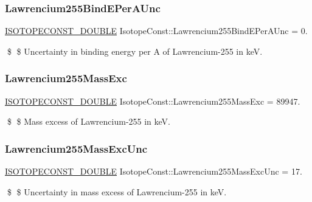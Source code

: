 \subsubsection{\texorpdfstring{Lawrencium255\+Bind\+E\+Per\+A\+Unc}{Lawrencium255BindEPerAUnc}}
{\footnotesize\ttfamily \mbox{\hyperlink{group___isotope_const-_macros_ga8f45a7272ce02c0b4c65c44636ed719a}{I\+S\+O\+T\+O\+P\+E\+C\+O\+N\+S\+T\+\_\+\+D\+O\+U\+B\+LE}} Isotope\+Const\+::\+Lawrencium255\+Bind\+E\+Per\+A\+Unc = 0.}

\$ \$ Uncertainty in binding energy per A of Lawrencium-\/255 in keV. \mbox{\label{group___isotope_const-_lawrencium-_lr255_ga5879f94861c51098d2dcc904a63f7c7a}} 
\subsubsection{\texorpdfstring{Lawrencium255\+Mass\+Exc}{Lawrencium255MassExc}}
{\footnotesize\ttfamily \mbox{\hyperlink{group___isotope_const-_macros_ga8f45a7272ce02c0b4c65c44636ed719a}{I\+S\+O\+T\+O\+P\+E\+C\+O\+N\+S\+T\+\_\+\+D\+O\+U\+B\+LE}} Isotope\+Const\+::\+Lawrencium255\+Mass\+Exc = 89947.}

\$ \$ Mass excess of Lawrencium-\/255 in keV. \mbox{\label{group___isotope_const-_lawrencium-_lr255_ga75e21e6a67820874ab056411ebce2f58}} 
\subsubsection{\texorpdfstring{Lawrencium255\+Mass\+Exc\+Unc}{Lawrencium255MassExcUnc}}
{\footnotesize\ttfamily \mbox{\hyperlink{group___isotope_const-_macros_ga8f45a7272ce02c0b4c65c44636ed719a}{I\+S\+O\+T\+O\+P\+E\+C\+O\+N\+S\+T\+\_\+\+D\+O\+U\+B\+LE}} Isotope\+Const\+::\+Lawrencium255\+Mass\+Exc\+Unc = 17.}

\$ \$ Uncertainty in mass excess of Lawrencium-\/255 in keV. \mbox{\label{group___isotope_const-_lawrencium-_lr255_gaf7938f48eddb724cdd6cfe7ae8d8074b}} 

